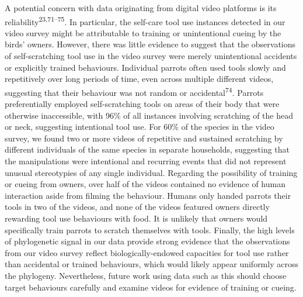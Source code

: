 \documentclass[
  man, donotrepeattitle,floatsintext]{apa6}
\begin{document}
A potential concern with data originating from digital video platforms is its
reliability\textsuperscript{23,71--75}.
In particular, the self-care tool use instances detected in our video survey
might be attributable to training or unintentional cueing by the birds' owners.
However, there was little evidence to suggest that the observations of
self-scratching tool use in the video survey were merely unintentional accidents
or explicitly trained behaviours. Individual parrots often used tools slowly and
repetitively over long periods of time, even across multiple different videos,
suggesting that their behaviour was not random or accidental\textsuperscript{74}.
Parrots preferentially employed self-scratching tools on areas of their body
that were otherwise inaccessible, with 96\% of all instances involving scratching
of the head or neck, suggesting intentional tool use. For 60\% of the species in
the video survey, we found two or more videos of repetitive and sustained
scratching by different individuals of the same species in separate households,
suggesting that the manipulations were intentional and recurring events that did
not represent unusual stereotypies of any single individual. Regarding the
possibility of training or cueing from owners, over half of the videos contained
no evidence of human interaction aside from filming the behaviour. Humans only
handed parrots their tools in two of the videos, and none of the videos featured
owners directly rewarding tool use behaviours with food. It is unlikely that
owners would specifically train parrots to scratch themselves with tools.
Finally, the high levels of phylogenetic signal in our data provide strong
evidence that the observations from our video survey reflect
biologically-endowed capacities for tool use rather than accidental or trained
behaviours, which would likely appear uniformly across the phylogeny.
Nevertheless, future work using data such as this should choose target
behaviours carefully and examine videos for evidence of training or cueing.
\end{document}
